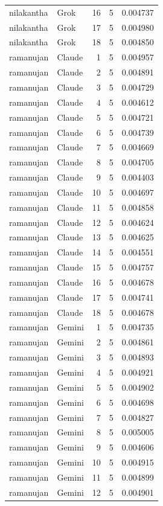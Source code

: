 \begin{longtable}{llrrr}
nilakantha & Grok & 16 & 5 & 0.004737\\
nilakantha & Grok & 17 & 5 & 0.004980\\
nilakantha & Grok & 18 & 5 & 0.004850\\
ramanujan & Claude & 1 & 5 & 0.004957\\
ramanujan & Claude & 2 & 5 & 0.004891\\
ramanujan & Claude & 3 & 5 & 0.004729\\
ramanujan & Claude & 4 & 5 & 0.004612\\
ramanujan & Claude & 5 & 5 & 0.004721\\
ramanujan & Claude & 6 & 5 & 0.004739\\
ramanujan & Claude & 7 & 5 & 0.004669\\
ramanujan & Claude & 8 & 5 & 0.004705\\
ramanujan & Claude & 9 & 5 & 0.004403\\
ramanujan & Claude & 10 & 5 & 0.004697\\
ramanujan & Claude & 11 & 5 & 0.004858\\
ramanujan & Claude & 12 & 5 & 0.004624\\
ramanujan & Claude & 13 & 5 & 0.004625\\
ramanujan & Claude & 14 & 5 & 0.004551\\
ramanujan & Claude & 15 & 5 & 0.004757\\
ramanujan & Claude & 16 & 5 & 0.004678\\
ramanujan & Claude & 17 & 5 & 0.004741\\
ramanujan & Claude & 18 & 5 & 0.004678\\
ramanujan & Gemini & 1 & 5 & 0.004735\\
ramanujan & Gemini & 2 & 5 & 0.004861\\
ramanujan & Gemini & 3 & 5 & 0.004893\\
ramanujan & Gemini & 4 & 5 & 0.004921\\
ramanujan & Gemini & 5 & 5 & 0.004902\\
ramanujan & Gemini & 6 & 5 & 0.004698\\
ramanujan & Gemini & 7 & 5 & 0.004827\\
ramanujan & Gemini & 8 & 5 & 0.005005\\
ramanujan & Gemini & 9 & 5 & 0.004606\\
ramanujan & Gemini & 10 & 5 & 0.004915\\
ramanujan & Gemini & 11 & 5 & 0.004899\\
ramanujan & Gemini & 12 & 5 & 0.004901\\

\end{longtable}
